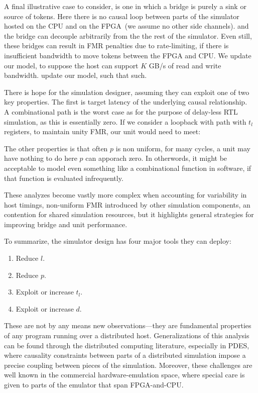 A final illustrative case to consider, is one in which a bridge is purely a
sink or source of tokens. Here there is no causal loop between parts of the
simulator hosted on the CPU and on the FPGA~(we assume no other side channels).
and the bridge can decouple arbitrarily from the the rest of the simulator.
Even still, these bridges can result in FMR penalties due to rate-limiting, if
there is insufficient bandwidth to move tokens between the FPGA and CPU. We update our model,
to suppose the host can support $K$ GB/s of read and write bandwidth.
update our model, such that such.

There is hope for the simulation designer, assuming they can exploit one of two key properties. 
The first is target latency of the underlying causal relationship.~ A combinational path is the worst case
as for the purpose of delay-less RTL simulation, as this is essentially zero. If we consider a loopback with
path with $t_l$ registers, to maintain unity FMR, our unit would need to meet:

The other properties is that often $p$ is non uniform, for many cycles, a unit
may have nothing to do here $p$ can apporach zero.  In otherwords, it might be
acceptable to model even something like a combinational function in software,
if that function is evaluated infrequently.

These analyzes become vastly more complex when accounting for variability in
host timings, non-uniform FMR introduced by other simulation components, an
contention for shared simulation resources, but it highlights  general
strategies for improving bridge and unit performance.

To summarize, the simulator design has four major tools they can deploy:
\begin{enumerate}
    \item Reduce $l$.
    \item Reduce $p$.
    \item Exploit or increase $t_l$.
    \item Exploit or increase $d$.
\end{enumerate}


These are not by any means new observations---they are fundamental properties
of any program running over a distributed host. Generalizations of this
analysis can be found through the distributed computing literature, especially
in PDES, where causality constraints between parts of a distributed simulation
impose a precise coupling between pieces of the simulation. Moreover, these
challenges are well known in the commercial hardware-emulation space, where
special care is given to parts of the emulator that span FPGA-and-CPU.


